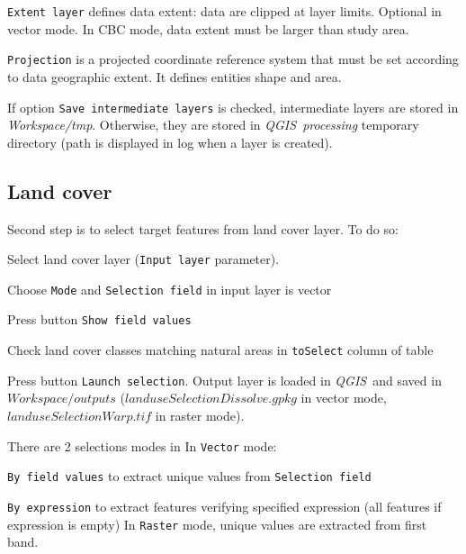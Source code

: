 \documentclass[11pt]{article}
\newcommand{\qgis}{\emph{QGIS}}
\let\tempone\itemize
\let\temptwo\enditemize
\renewenvironment{itemize}{\tempone\addtolength{\itemsep}{-0.5\baselineskip}}{\temptwo}
\renewenvironment{enumerate}{\tempone\addtolength{\itemsep}{-0.5\baselineskip}}{\temptwo}
\begin{document}
\texttt{Extent layer} defines data extent: data are clipped at layer limits. Optional in vector mode. In CBC mode, data extent must be larger than study area.

\texttt{Projection} is a projected coordinate reference system that must be set according to data geographic extent. It defines entities shape and area.

If option \texttt{Save intermediate layers} is checked, intermediate layers are stored in \textit{Workspace/tmp}. Otherwise, they are stored in \qgis\ \textit{processing} temporary directory (path is displayed in log when a layer is created).


\pagebreak

\subsection{Land cover}

Second step is to select target features from land cover layer. To do so:

\begin{enumerate}
    \item Select land cover layer (\texttt{Input layer} parameter).
    \item Choose \texttt{Mode} and \texttt{Selection field} in input layer is vector
    \item Press button \texttt{Show field values}
    \item Check land cover classes matching natural areas in \texttt{toSelect} column of table
    \item Press button \texttt{Launch selection}. Output layer is loaded in \qgis\ and saved in $Workspace/outputs$ ($landuseSelectionDissolve.gpkg$ in vector mode, $landuseSelectionWarp.tif$ in raster mode).
\end{enumerate}

\vspace*{-0.5cm}
There are 2 selections modes in In \texttt{Vector} mode:
\vspace*{-0.2cm}
\begin{itemize}
\item \texttt{By field values} to extract unique values from \texttt{Selection field}
\item \texttt{By expression} to extract features verifying specified expression (all features if expression is empty)
\end{itemize}
\vspace*{-0.2cm}
In \texttt{Raster} mode, unique values are extracted from first band.
\frameboxend
\end{document}
